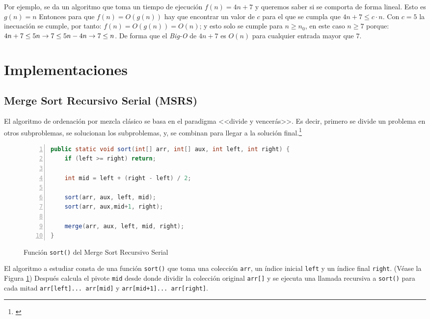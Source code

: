 \documentclass[titlepage]{article}
\begin{document}
Por ejemplo, se da un algoritmo que toma un tiempo de ejecución \(f(n) = 4n+7\) y queremos saber si se comporta de forma lineal. Esto es \(g(n)=n\) Entonces para que \(f(n) = O(g(n))\) hay que encontrar un valor de \(c\) para el que se cumpla que \(4n+7 \leq c\cdot n\). Con \(c=5\) la inecuación se cumple, por tanto: \(f(n) = O(g(n)) = O(n)\); y esto solo se cumple para \(n \geq n_0\), en este caso \(n\geq 7\) porque: \(4n+7 \leq 5n \space \rightarrow 7 \leq 5n - 4n   \rightarrow 7 \leq n\). De forma que el \textit{Big-O} de \(4n+7\) es \(O(n)\) para cualquier entrada mayor que \(7\).


\newpage
\section{Implementaciones}

\subsection{Merge Sort Recursivo Serial (MSRS)}
El algoritmo de ordenación por mezcla clásico se basa en el paradigma <<divide y vencerás>>. Es decir, primero se divide un problema en otros subproblemas, se solucionan los subproblemas, y, se combinan para llegar a la solución
final.\footnote{\cite{Sedgewick2003-cd}}

\begin{figure}[h]
    \begin{lstlisting}[language=java, frame=single, numbers=left]
public static void sort(int[] arr, int[] aux, int left, int right) {
	if (left >= right) return;
	
	int mid = left + (right - left) / 2;
	
	sort(arr, aux, left, mid);
	sort(arr, aux,mid+1, right);
	
	merge(arr, aux, left, mid, right);
}
    \end{lstlisting}
    \caption{Función \lstinline{sort()} del Merge Sort Recursivo Serial}
    \label{fig:MSRS_sort()}
\end{figure}

El algoritmo a estudiar consta de una función \lstinline{sort()} que toma una colección \lstinline{arr}, un índice inicial \lstinline{left} y un índice final \lstinline{right}. (Véase la Figura \ref{fig:MSRS_sort()}) Después calcula el pivote \lstinline{mid} desde donde dividir la colección original \lstinline{arr[]} y se ejecuta una llamada recursiva a \lstinline{sort()} para cada mitad \lstinline{arr[left]... arr[mid]} y \lstinline{arr[mid+1]... arr[right]}.
\end{document}
